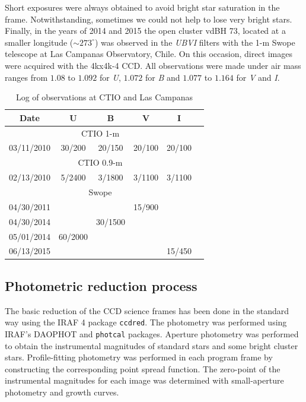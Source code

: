 \documentclass[draft]{aa}
\begin{document}
Short exposures were always obtained to avoid bright star saturation in the
frame. Notwithstanding, sometimes we could not help to lose very bright stars.
Finally, in the years of 2014 and 2015 the open cluster vdBH 73,
located at a smaller longitude ($\sim 273^\circ$) was observed in the 
\textit{UBVI} filters with the 1-m Swope telescope at Las Campanas Observatory,
Chile. On this occasion, direct images were acquired with the 4kx4k-4 CCD. All
observations were made under air mass ranges from $1.08$ to $1.092$ for 
\textit{U}, $1.072$ for \textit{B} and $1.077$ to $1.164$ for \textit{V} and 
\textit{I}.

\begin{table}[ht]
    \centering
    \begin{tabular}{cccccc}
    \hline
         Date & U & B & V & I  \\
         \hline \hline
         \multicolumn{5}{c}{CTIO 1-m}\\
         \hline
         03/11/2010 & 30/200 & 20/150 & 20/100 & 20/100\\
         \multicolumn{5}{c}{CTIO 0.9-m}\\
         \hline
         02/13/2010 & 5/2400 & 3/1800 & 3/1100 & 3/1100\\
         \multicolumn{5}{c}{Swope}\\
         \hline
         04/30/2011 & & & 15/900 & \\
         04/30/2014 & & 30/1500 & & \\
         05/01/2014 & 60/2000 & & & \\
         06/13/2015 & & & & 15/450 \\
         \hline
    \end{tabular}
    \caption{Log of observations at CTIO and Las Campanas}
    \label{tab:log_ctio}
\end{table}




\subsection{Photometric reduction process}

The basic reduction of the CCD science frames has been done in the standard way
using the IRAF 4 package \texttt{ccdred}. The photometry was performed using
IRAF's DAOPHOT \citep{Stetson_1987,Stetson_1990} and \texttt{photcal} packages.
Aperture photometry was performed to obtain the instrumental magnitudes of
standard stars and some bright cluster stars. Profile-fitting photometry was
performed in each program frame by constructing the corresponding point spread
function. The zero-point of the instrumental magnitudes for each image was
determined with small-aperture photometry and growth curves.
\end{document}

